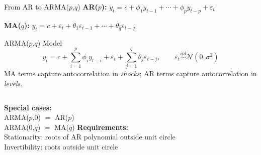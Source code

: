 \documentclass[aspectratio=169, 11pt]{beamer}
\begin{document}
\begin{frame}{From AR to ARMA($p$,$q$)}
  \textbf{AR($p$):} $y_t = c + \phi_1 y_{t-1} + \cdots + \phi_p y_{t-p} + \varepsilon_t$

  \textbf{MA($q$):} $y_t = c + \varepsilon_t + \theta_1\varepsilon_{t-1}
                    + \cdots + \theta_q\varepsilon_{t-q}$

  \begin{definitionbox}{ARMA($p$,$q$) Model}
    {\small
    \[
      y_t = c + \sum_{i=1}^{p}\phi_i y_{t-i}
              + \varepsilon_t
              + \sum_{j=1}^{q}\theta_j\varepsilon_{t-j},
      \qquad \varepsilon_t \overset{iid}{\sim}\mathcal{N}(0,\sigma^2)
    \]
    MA terms capture autocorrelation in \emph{shocks}; AR terms capture
    autocorrelation in \emph{levels}.}
  \end{definitionbox}
  \begin{columns}[T]
      \textbf{Special cases:}\\
      ARMA($p$,0) $=$ AR($p$)\\
      ARMA(0,$q$) $=$ MA($q$)
      \textbf{Requirements:}\\
      Stationarity: roots of AR polynomial outside unit circle\\
      Invertibility: roots outside unit circle 
  \end{columns}
\end{frame}
\end{document}

